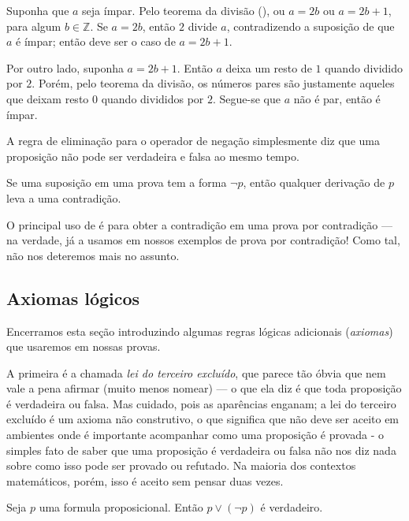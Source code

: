 \begin{estratégia}
\begin{cproof}
Suponha que $a$ seja ímpar. Pelo teorema da divisão (), ou $a=2b$ ou $a=2b+1$, para algum $b \in \mathbb{Z}$. Se $a=2b$, então $2$ divide $a$, contradizendo a suposição de que $a$ é ímpar; então deve ser o caso de $a=2b+1$.

Por outro lado, suponha $a=2b+1$. Então $a$ deixa um resto de $1$ quando dividido por $2$. Porém, pelo teorema da divisão, os números pares são justamente aqueles que deixam resto $0$ quando divididos por $2$. Segue-se que $a$ não é par, então é ímpar.
\end{cproof}


A regra de eliminação para o operador de negação \elimrule{\neg} simplesmente diz que uma proposição não pode ser verdadeira e falsa ao mesmo tempo.

\begin{strategy}
\label{strAssumingNegations}
Se uma suposição em uma prova tem a forma $\neg p$, então qualquer derivação de $p$ leva a uma contradição.
\end{strategy}

O principal uso de  é para obter a contradição em uma prova por contradição — na verdade, já a usamos em nossos exemplos de prova por contradição! Como tal, não nos deteremos mais no assunto.

\subsection*{Axiomas lógicos}

Encerramos esta seção introduzindo algumas regras lógicas adicionais (\textit{axiomas}) que usaremos em nossas provas.

A primeira é a chamada \textit{lei do terceiro excluído}, que parece tão óbvia que nem vale a pena afirmar (muito menos nomear) --- o que ela diz é que toda proposição é verdadeira ou falsa. Mas cuidado, pois as aparências enganam; a lei do terceiro excluído é um axioma não construtivo, o que significa que não deve ser aceito em ambientes onde é importante acompanhar como uma proposição é provada - o simples fato de saber que uma proposição é verdadeira ou falsa não nos diz nada sobre como isso pode ser provado ou refutado. Na maioria dos contextos matemáticos, porém, isso é aceito sem pensar duas vezes.
\begin{axiom}
\label{axLEM}
Seja $p$ uma formula proposicional. Então $p \vee (\neg p)$ é verdadeiro.
\end{axiom}


\end{estratégia}
